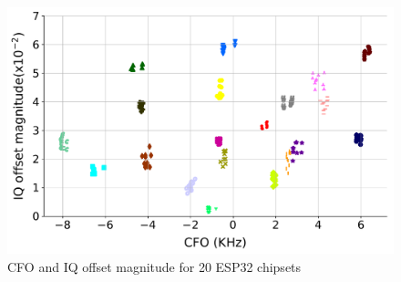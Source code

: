 \begin{figure}[t!]
    \centering
    \includegraphics[width = \linewidth]{plots/ESP_CFOIQ.pdf} 
    \caption{CFO and IQ offset magnitude for 20 ESP32 chipsets}
    \label{fig:esp}
\end{figure}

